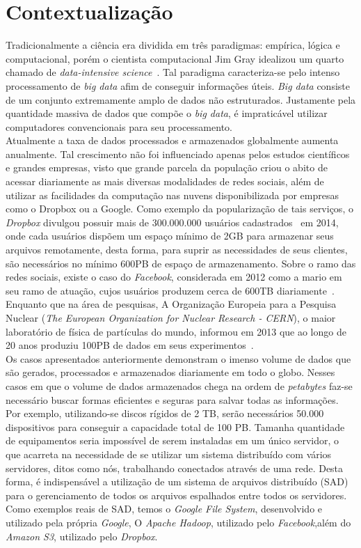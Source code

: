 
	\section{Contextualização}
	Tradicionalmente a ciência era dividida em três paradigmas: empírica, lógica e computacional, porém o cientista computacional Jim Gray idealizou um quarto chamado de \textit{data-intensive science}~\cite{hey2009}. Tal paradigma caracteriza-se pelo intenso processamento de \textit{big data} afim de conseguir informações úteis. \textit{Big data} consiste de um conjunto extremamente amplo de dados não estruturados. Justamente pela quantidade massiva de dados que compõe o \textit{big data}, é impraticável utilizar computadores convencionais para seu processamento.
	\\
	
	Atualmente a taxa de dados processados e armazenados globalmente aumenta anualmente. Tal crescimento não foi influenciado apenas pelos estudos científicos e grandes empresas, visto que grande parcela da população criou o abito de acessar diariamente as mais diversas modalidades de redes sociais, além de utilizar as facilidades da computação nas nuvens disponibilizada por empresas como o Dropbox ou a Google. Como exemplo da popularização de tais serviços, o \textit{Dropbox} divulgou possuir mais de 300.000.000 usuários cadastrados~\cite{dropbox} em 2014, onde cada usuários dispõem um espaço mínimo de 2GB para armazenar seus arquivos remotamente, desta forma, para suprir as necessidades de seus clientes, são necessários no mínimo 600PB de espaço de armazenamento. Sobre o ramo das redes sociais, existe o caso do \textit{Facebook}, considerada em 2012 como a mario em seu ramo de atuação, cujos usuários produzem cerca de 600TB diariamente~\cite{facebook14}. Enquanto que na área de pesquisas, A Organização Europeia para a Pesquisa Nuclear (\textit{The European Organization for Nuclear Research - CERN}), o maior laboratório de física de partículas do mundo, informou em 2013 que ao longo de 20 anos produziu 100PB de dados em seus experimentos~\cite{cern}.
	\\
	
	Os casos apresentados anteriormente demonstram o imenso volume de dados que são gerados, processados e armazenados diariamente em todo o globo. Nesses casos em que o volume de dados armazenados chega na ordem de \textit{petabytes} faz-se necessário buscar formas eficientes e seguras para salvar todas as informações. Por exemplo, utilizando-se discos rígidos de 2 TB, serão necessários 50.000 dispositivos para conseguir a capacidade total de 100 PB. Tamanha quantidade de equipamentos seria impossível de serem instaladas em um único servidor, o que acarreta na necessidade de se utilizar um sistema distribuído com vários servidores, ditos como nós, trabalhando conectados através de uma rede. Desta forma, é indispensável a utilização de um sistema de arquivos distribuído (SAD) para o gerenciamento de todos os arquivos espalhados entre todos os servidores. Como exemplos reais de SAD, temos  o \textit{Google File System}, desenvolvido e utilizado pela própria \textit{Google}, O \textit{Apache Hadoop}, utilizado pelo \textit{Facebook},além do \textit{Amazon S3}, utilizado pelo \textit{Dropbox}.
	\\
	
